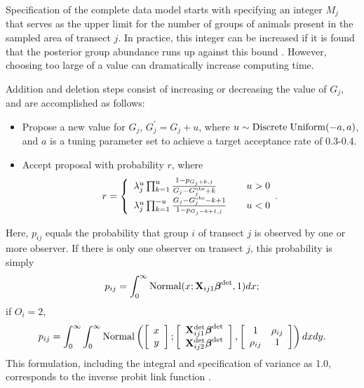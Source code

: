 \documentclass[10pt]{article}
\begin{document}
Specification of the complete data model starts with specifying an integer $M_j$ that serves as the upper limit for the number of groups of animals present in the sampled area of transect $j$. In practice, this integer can be increased if it is found that the posterior group abundance runs up against this bound \cite{DurbanElston2005,RoyleEtAl2007b}. However, choosing too large of a value can dramatically increase computing time.

Addition and deletion steps consist of increasing or decreasing the value of $G_j$, and are accomplished as follows:
\begin{itemize}
    \item Propose a new value for $G_j$, $G_j^\prime=G_j+u$, where
    $u\sim {\rm Discrete \hspace{1mm} Uniform}(-a,a)$, and $a$ is a tuning parameter set to achieve a target acceptance rate of 0.3-0.4.
    \item Accept proposal with probability $r$, where
    $$
    r= \left\{ \begin{array}{lll}
				\lambda_j^u \prod_{k=1}^u
                \frac{1-p_{G_j+k,j}}{G_j-G_j^{\rm obs}+k}& & u>0\\
			    \lambda_j^u \prod_{k=1}^{-u}
                \frac{G_j-G_j^{\rm obs}-k+1}{
                1-p_{G_j-k+1,j}}& & u<0
		\end{array}. \right.
    $$
\end{itemize}
    Here, $p_{ij}$ equals the probability that group $i$ of transect $j$ is observed by one or more observer.  If there is only one observer on transect $j$, this probability is simply $$
      p_{ij} = \int_0^\infty {\rm Normal}(x;{\bf X}_{ij1}\boldsymbol{\beta}^{\rm det},1)dx;
    $$
    if $O_i=2$,
    $$
      p_{ij} = \int_0^\infty \int_0^\infty {\rm Normal}
        \left( \left[ \begin{array}{c}
				x\\
				y
		\end{array} \right]; \left[
        \begin{array}{c}
				{\bf X}_{ij1}^{\rm det} \boldsymbol{\beta}^{\rm
                det}\\
				{\bf X}_{ij2}^{\rm det} \boldsymbol{\beta}^{\rm
                det}
		\end{array}\right],
        \left[ \begin{array}{cc}
            1 & \rho_{ij} \\
            \rho_{ij} & 1
        \end{array} \right]
        \right) dx dy.
    $$
This formulation, including the integral and specification of variance as 1.0, corresponds to the inverse probit link function \cite{Collett2003}.
\end{document}
